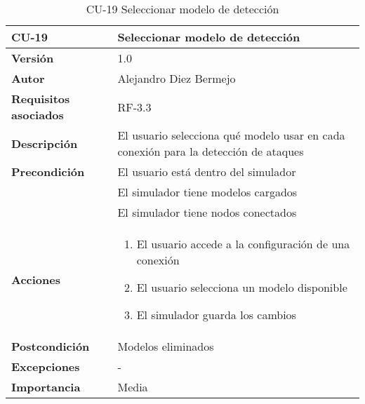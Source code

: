 \begin{table}[p]
	\centering
	\begin{tabularx}{\linewidth}{ p{} p{} }
		\toprule
		\textbf{CU-19}    & \textbf{Seleccionar modelo de detección}\\
		\toprule
		\textbf{Versión}              & 1.0    \\
		\textbf{Autor}                & Alejandro Diez Bermejo \\
		\textbf{Requisitos asociados} & RF-3.3 \\
		\textbf{Descripción}          & El usuario selecciona qué modelo usar en cada conexión para la detección de ataques \\
        \textbf{Precondición}         & El usuario está dentro del simulador \\
                                      & El simulador tiene modelos cargados \\
                                      & El simulador tiene nodos conectados \\
		\textbf{Acciones}             &
		\begin{enumerate}
			\def\labelenumi{\arabic{enumi}.}
			\tightlist
			\item El usuario accede a la configuración de una conexión
            \item El usuario selecciona un modelo disponible
            \item El simulador guarda los cambios
		\end{enumerate}\\
		\textbf{Postcondición}        & Modelos eliminados \\
		\textbf{Excepciones}          & - \\
		\textbf{Importancia}          & Media \\
		\bottomrule
	\end{tabularx}
	\caption{CU-19 Seleccionar modelo de detección}
\end{table}

